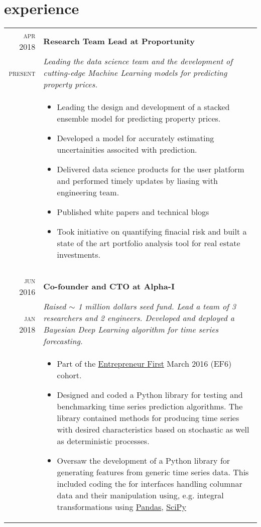 \documentclass[a4paper,10pt]{article}
\begin{document}
\section{experience}
\begin{tabular}{r|p{11cm}}
\textsc{apr 2018} & \textbf{Research Team Lead at Proportunity} \\
\textsc{present} & \emph{Leading the data science team and the development of cutting-edge Machine Learning models
for predicting property prices. } \\
& \small {
  \begin{itemize}
    \item Leading the design and development of a stacked ensemble model for predicting property prices.
    \item Developed a model for accurately estimating uncertainities associted with prediction.
    \item Delivered data science products for the user platform and performed timely updates 
    by liasing with engineering team.
    \item Published white papers and technical blogs
    \item Took initiative on quantifying finacial risk and built a state of the art portfolio analysis tool for
    real estate investments.
  \end{itemize}
}\\
\multicolumn{2}{c}{} \\
\textsc{jun 2016} & \textbf{Co-founder and CTO at Alpha-I} \\
\textsc{jan 2018} & \emph{Raised $\sim$ 1 million dollars seed fund. Lead a team of 3 researchers and 2 engineers. Developed and deployed a Bayesian Deep Learning algorithm for time series forecasting.}\\
&\small{
\begin{itemize}
  \item Part of the \href{https://www.joinef.com/}{Entrepreneur First} March 2016 (EF6) cohort.
  \item Designed and coded a Python library for testing and benchmarking time series prediction algorithms.
  The library contained methods for producing time series with desired characteristics based on stochastic as well as
  deterministic processes.
  \item Oversaw the development of a Python library for generating features from generic time series data.
  This included coding the for interfaces handling columnar data and their manipulation using, e.g.
  integral transformations using \href{https://pandas.pydata.org/}{Pandas}, \href{https://www.scipy.org/}{SciPy}

\end{itemize}}
\end{tabular}
\end{document}
